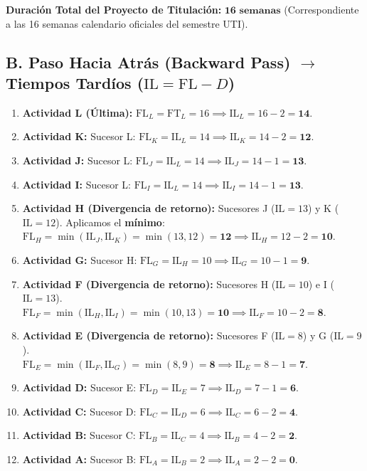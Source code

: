 \documentclass[11pt,a4paper]{article}
\begin{document}
\vspace{-0.1cm}
\begin{tcolorbox}[colback=utiLightBlue, colframe=utiBlue, arc=3pt, left=8pt, right=8pt, top=4pt, bottom=4pt]
\footnotesize\textbf{Duración Total del Proyecto de Titulación:} $\mathbf{16\text{ semanas}}$ (Correspondiente a las 16 semanas calendario oficiales del semestre UTI).
\end{tcolorbox}

\subsection*{\small\color{utiBlue}B. Paso Hacia Atrás (Backward Pass) $\rightarrow$ Tiempos Tardíos ($\text{IL} = \text{FL} - D$)}
\begin{enumerate}\setlength\itemsep{2pt}\footnotesize
    \item \textbf{Actividad L (Última):} $\text{FL}_L = \text{FT}_L = 16 \implies \text{IL}_L = 16 - 2 = \mathbf{14}$.
    \item \textbf{Actividad K:} Sucesor L: $\text{FL}_K = \text{IL}_L = 14 \implies \text{IL}_K = 14 - 2 = \mathbf{12}$.
    \item \textbf{Actividad J:} Sucesor L: $\text{FL}_J = \text{IL}_L = 14 \implies \text{IL}_J = 14 - 1 = \mathbf{13}$.
    \item \textbf{Actividad I:} Sucesor L: $\text{FL}_I = \text{IL}_L = 14 \implies \text{IL}_I = 14 - 1 = \mathbf{13}$.
    \item \textbf{Actividad H (Divergencia de retorno):} Sucesores J ($\text{IL}=13$) y K ($\text{IL}=12$). Aplicamos el \textbf{mínimo}:\\
    $\text{FL}_H = \min(\text{IL}_J, \text{IL}_K) = \min(13, 12) = \mathbf{12} \implies \text{IL}_H = 12 - 2 = \mathbf{10}$.
    \item \textbf{Actividad G:} Sucesor H: $\text{FL}_G = \text{IL}_H = 10 \implies \text{IL}_G = 10 - 1 = \mathbf{9}$.
    \item \textbf{Actividad F (Divergencia de retorno):} Sucesores H ($\text{IL}=10$) e I ($\text{IL}=13$).\\
    $\text{FL}_F = \min(\text{IL}_H, \text{IL}_I) = \min(10, 13) = \mathbf{10} \implies \text{IL}_F = 10 - 2 = \mathbf{8}$.
    \item \textbf{Actividad E (Divergencia de retorno):} Sucesores F ($\text{IL}=8$) y G ($\text{IL}=9$).\\
    $\text{FL}_E = \min(\text{IL}_F, \text{IL}_G) = \min(8, 9) = \mathbf{8} \implies \text{IL}_E = 8 - 1 = \mathbf{7}$.
    \item \textbf{Actividad D:} Sucesor E: $\text{FL}_D = \text{IL}_E = 7 \implies \text{IL}_D = 7 - 1 = \mathbf{6}$.
    \item \textbf{Actividad C:} Sucesor D: $\text{FL}_C = \text{IL}_D = 6 \implies \text{IL}_C = 6 - 2 = \mathbf{4}$.
    \item \textbf{Actividad B:} Sucesor C: $\text{FL}_B = \text{IL}_C = 4 \implies \text{IL}_B = 4 - 2 = \mathbf{2}$.
    \item \textbf{Actividad A:} Sucesor B: $\text{FL}_A = \text{IL}_B = 2 \implies \text{IL}_A = 2 - 2 = \mathbf{0}$.
\end{enumerate}
\end{document}
